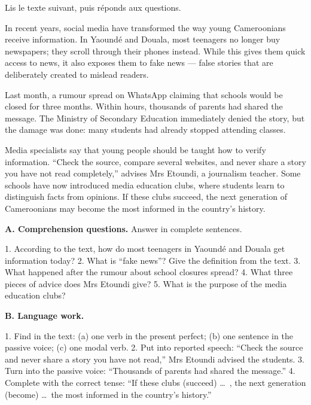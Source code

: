 \documentclass[11pt]{article}
\begin{document}
\begin{exercice}
Lis le texte suivant, puis réponds aux questions.

\begin{textebox}
In recent years, social media have transformed the way young Cameroonians receive information. In Yaoundé and Douala, most teenagers no longer buy newspapers; they scroll through their phones instead. While this gives them quick access to news, it also exposes them to fake news — false stories that are deliberately created to mislead readers.

Last month, a rumour spread on WhatsApp claiming that schools would be closed for three months. Within hours, thousands of parents had shared the message. The Ministry of Secondary Education immediately denied the story, but the damage was done: many students had already stopped attending classes.

Media specialists say that young people should be taught how to verify information. “Check the source, compare several websites, and never share a story you have not read completely,” advises Mrs Etoundi, a journalism teacher. Some schools have now introduced media education clubs, where students learn to distinguish facts from opinions. If these clubs succeed, the next generation of Cameroonians may become the most informed in the country's history.
\end{textebox}

\textbf{A. Comprehension questions.} Answer in complete sentences.

1. According to the text, how do most teenagers in Yaoundé and Douala get information today?
2. What is “fake news”? Give the definition from the text.
3. What happened after the rumour about school closures spread?
4. What three pieces of advice does Mrs Etoundi give?
5. What is the purpose of the media education clubs?

\textbf{B. Language work.}

1. Find in the text: (a) one verb in the present perfect; (b) one sentence in the passive voice; (c) one modal verb.
2. Put into reported speech: “Check the source and never share a story you have not read,” Mrs Etoundi advised the students.
3. Turn into the passive voice: “Thousands of parents had shared the message.”
4. Complete with the correct tense: “If these clubs (succeed) \ldots\ , the next generation (become) \ldots\ the most informed in the country's history.”
\end{exercice}
\end{document}
